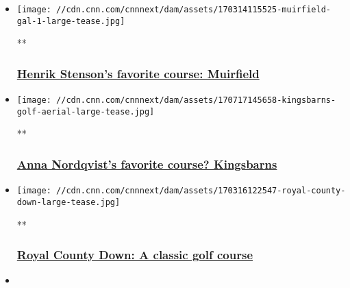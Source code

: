 \begin{itemize}
\item
  \href{/videos/sports/2018/10/17/henrik-stenson-favorite-course-muirfield-scotland-open-championship-golf-spt-intl.cnn}{}

  \texttt{[image: //cdn.cnn.com/cnnnext/dam/assets/170314115525-muirfield-gal-1-large-tease.jpg]}

  **

  \hypertarget{henrik-stensons-favorite-course-muirfield}{%
  \subsubsection{\texorpdfstring{\href{/videos/sports/2018/10/17/henrik-stenson-favorite-course-muirfield-scotland-open-championship-golf-spt-intl.cnn}{Henrik
  Stenson's favorite course:
  Muirfield}}{Henrik Stenson's favorite course: Muirfield}}\label{henrik-stensons-favorite-course-muirfield}}
\item
  \href{/videos/sports/2018/10/18/anna-nordqvist-favorite-golf-course-kingsbarns-scotland-living-golf-spt-intl.cnn}{}

  \texttt{[image: //cdn.cnn.com/cnnnext/dam/assets/170717145658-kingsbarns-golf-aerial-large-tease.jpg]}

  **

  \hypertarget{anna-nordqvists-favorite-course-kingsbarns}{%
  \subsubsection{\texorpdfstring{\href{/videos/sports/2018/10/18/anna-nordqvist-favorite-golf-course-kingsbarns-scotland-living-golf-spt-intl.cnn}{Anna
  Nordqvist's favorite course?
  Kingsbarns}}{Anna Nordqvist's favorite course? Kingsbarns}}\label{anna-nordqvists-favorite-course-kingsbarns}}
\item
  \href{/videos/sports/2018/10/19/david-leadbetter-favorite-golf-course-royal-county-down-northern-ireland-living-golf-spt-intl.cnn}{}

  \texttt{[image: //cdn.cnn.com/cnnnext/dam/assets/170316122547-royal-county-down-large-tease.jpg]}

  **

  \hypertarget{royal-county-down-a-classic-golf-course}{%
  \subsubsection{\texorpdfstring{\href{/videos/sports/2018/10/19/david-leadbetter-favorite-golf-course-royal-county-down-northern-ireland-living-golf-spt-intl.cnn}{Royal
  County Down: A classic golf
  course}}{Royal County Down: A classic golf course}}\label{royal-county-down-a-classic-golf-course}}
\item
  \href{/videos/sports/2018/10/01/georgia-hall-on-the-bag-evian-championship-womens-british-open-living-golf-spt-intl.cnn}{}


\end{itemize}

